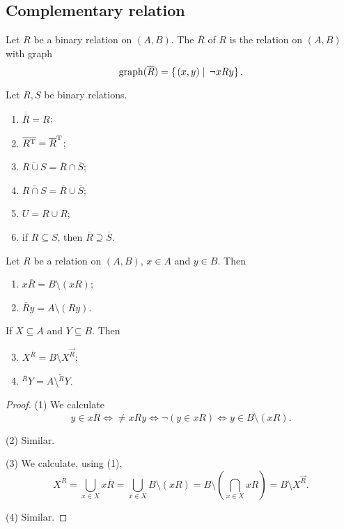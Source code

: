 \subsection{Complementary relation}
\begin{definition}
Let $R$ be a binary relation on $(A, B)$. The  $\overline{R}$ of $R$ is the relation on $(A, B)$ with graph
\[ \operatorname{graph}(\overline{R}) = \left\{\left. (x,y) \;\right|\; \neg xRy \right\}. \]
\end{definition}
\begin{lemma} \label{relationalComplementProperties}
Let $R,S$ be binary relations.
\begin{enumerate}
\item $\overline{\overline{R}} = R$;
\item $\overline{R^{\mathrm{T}}} = \overline{R}^{\mathrm{T}}$;
\item $\overline{R\cup S} = \overline{R}\cap \overline{S}$;
\item $\overline{R\cap S} = \overline{R}\cup \overline{S}$;
\item $U = R \cup \overline{R}$;
\item if $R \subseteq S$, then $\overline{R} \supseteq \overline{S}$.
\end{enumerate}
\end{lemma}

\begin{lemma}
Let $R$ be a relation on $(A,B)$, $x\in A$ and $y\in B$. Then
\begin{enumerate}
\item $x\overline{R} = B\setminus (xR)$;
\item $\overline{R}y = A\setminus (Ry)$.
\end{enumerate}
If $X\subseteq A$ and $Y\subseteq B$. Then
\begin{enumerate} \setcounter{enumi}{2}
\item $X^{\overline{R}} = B\setminus X^{\overrightarrow{R}}$;
\item $^{\overline{R}}Y = A\setminus {^{\overleftarrow{R}}Y}$.
\end{enumerate}
\end{lemma}
\begin{proof}
(1) We calculate
\[ y \in x\overline{R} \iff \neq xRy \iff \neg (y\in xR) \iff y\in B\setminus (xR). \]

(2) Similar.

(3) We calculate, using (1),
\[ X^{\overline{R}} = \bigcup_{x\in X}x\overline{R} = \bigcup_{x\in X}B\setminus (xR) = B\setminus \left(\bigcap_{x\in X}xR\right) = B\setminus X^{\overrightarrow{R}}. \]

(4) Similar.
\end{proof}

